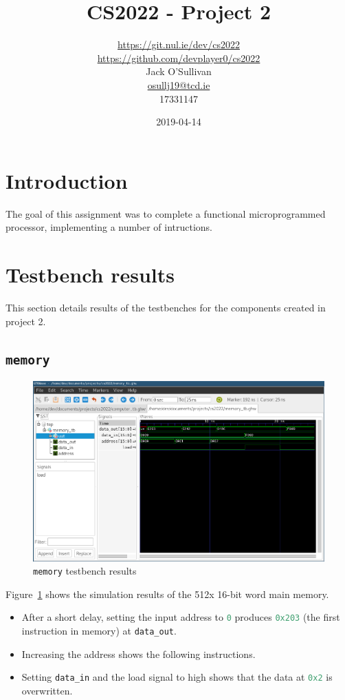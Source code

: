 \documentclass[a4paper]{article}
\title{CS2022 - Project 2}
\date{2019-04-14}
\author{\url{https://git.nul.ie/dev/cs2022}\\\url{https://github.com/devplayer0/cs2022}\\Jack O'Sullivan\\\href{mailto:osullj19@tcd.ie}{osullj19@tcd.ie}\\17331147}
\numberwithin{figure}{section}
\numberwithin{table}{section}
\newcommand{\mi}{\mintinline}
\begin{document}
\maketitle
\tableofcontents
{}

\newpage
{}
\section{Introduction}
The goal of this assignment was to complete a functional microprogrammed processor, implementing a number of intructions.

\section{Testbench results}
This section details results of the testbenches for the components created in project 2.

\subsection{\mi{c}{memory}}
\begin{figure}[h!]
	\centering
	\includegraphics[width=\textwidth]{memory_tb}
	\caption{\mi{c}{memory} testbench results}
	\label{fig:memory}
\end{figure}

Figure~\ref{fig:memory} shows the simulation results of the 512x 16-bit word main memory.
\begin{itemize}
	\item After a short delay, setting the input address to \mi{c}{0} produces \mi{c}{0x203} (the first instruction in memory) at \mi{c}{data_out}.
	\item Increasing the address shows the following instructions.
	\item Setting \mi{c}{data_in} and the load signal to high shows that the data at \mi{c}{0x2} is overwritten.
\end{itemize}
\end{document}
